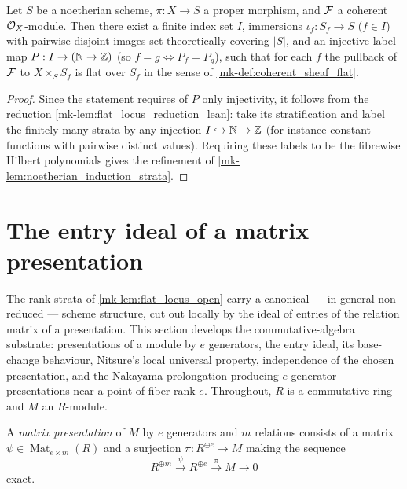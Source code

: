 \begin{lemma}\label{mk-lem:flat_locus_assembly_lean}
  \leanok

  Let \(S\) be a noetherian scheme, \(\pi : X \to S\) a proper morphism,
  and \(\mathcal{F}\) a coherent \(\mathcal{O}_X\)-module. Then there exist a finite index set
  \(I\), immersions \(\iota_f : S_f \to S\) (\(f \in I\)) with pairwise disjoint
  images set-theoretically covering \(|S|\), and an injective label map
  \(P : I \to (\mathbb{N} \to \mathbb{Z})\) (so \(f = g \iff P_f = P_g\)), such that for
  each \(f\) the pullback of \(\mathcal{F}\) to \(X \times_S S_f\) is flat over \(S_f\) in
  the sense of \ref{mk-def:coherent_sheaf_flat}.
\end{lemma}

\begin{proof}
  \leanok
  Since the statement requires of \(P\) only injectivity, it follows from the
  reduction \ref{mk-lem:flat_locus_reduction_lean}: take its stratification and
  label the finitely many strata by any injection
  \(I \hookrightarrow \mathbb{N} \to \mathbb{Z}\) (for instance constant functions
  with pairwise distinct values).  Requiring these labels to be the fibrewise
  Hilbert polynomials gives the refinement of
  \ref{mk-lem:noetherian_induction_strata}.
\end{proof}

\section{The entry ideal of a matrix presentation}
\label{mk-sec:entry_ideal}

The rank strata of \ref{mk-lem:flat_locus_open} carry a canonical --- in
general non-reduced --- scheme structure, cut out locally by the ideal of
entries of the relation matrix of a presentation.  This section develops the
commutative-algebra substrate: presentations of a module by \(e\)
generators, the entry ideal, its base-change behaviour, Nitsure's local
universal property, independence of the chosen presentation, and the
Nakayama prolongation producing \(e\)-generator presentations near a point
of fiber rank \(e\).  Throughout, \(R\) is a commutative ring and \(M\) an
\(R\)-module.

\begin{definition}
  \label{mk-def:matrix_presentation}
  \leanok

  A \emph{matrix presentation} of \(M\) by \(e\) generators and \(m\)
  relations consists of a matrix
  \(\psi \in \operatorname{Mat}_{e \times m}(R)\) and a surjection
  \(\pi : R^{\oplus e} \to M\) making the sequence
  \[
    R^{\oplus m} \xrightarrow{\ \psi\ } R^{\oplus e}
      \xrightarrow{\ \pi\ } M \to 0
  \]
  exact.
\end{definition}

